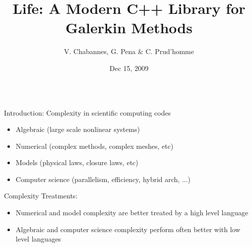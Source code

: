 \documentclass[final,utf8,,hyperref={pdfpagelabels=false}]{beamer}
\title[Life]{Life: A Modern C++ Library for Galerkin Methods}
\author[V. Chabannes, G. Pena \& C. Prud'homme]{V. Chabannes, G. Pena \& C. Prud'homme}
\institute[U. Coimbra \& U. Grenoble]{U. Coimbra and U. de Grenoble}
\date{Dec 15, 2009}
\begin{document}
  \begin{frame}[containsverbatim]{} 
    \vfill
    \begin{columns}[c]

    \begin{block}{Introduction: Complexity in scientific computing codes}
      \begin{itemize}
      \item Algebraic (large scale nonlinear systems)
      \item Numerical (complex methods, complex meshes, etc)
      \item Models (physical laws, closure laws, etc)
      \item Computer science (parallelism, efficiency, hybrid arch, ...)
      \end{itemize}
      
      Complexity Treatments:
      \begin{itemize}
      \item Numerical and model complexity are better treated by a
        \alert{high level language}
      \item Algebraic and computer science complexity perform often better with
        \alert{low level languages}
      \end{itemize}
    \end{block}
    
    \vfill


\end{columns}
\end{frame}
\end{document}
